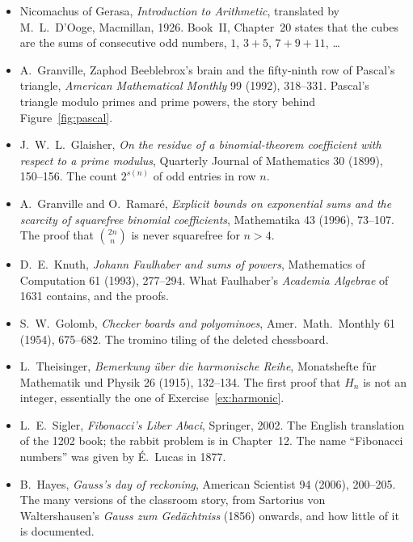 \begin{itemize}
\item Nicomachus of Gerasa, \emph{Introduction to Arithmetic}, translated by M.~L.~D'Ooge, Macmillan, 1926. Book~II, Chapter~20 states that the cubes are the sums of consecutive odd numbers, $1$, $3+5$, $7+9+11$, \dots
\item A.~Granville, Zaphod Beeblebrox's brain and the fifty-ninth row of Pascal's triangle, \emph{American Mathematical Monthly} 99 (1992), 318--331. Pascal's triangle modulo primes and prime powers, the story behind Figure~\ref{fig:pascal}.
\item J.~W.~L.~Glaisher, \emph{On the residue of a binomial-theorem coefficient with respect to a prime modulus}, Quarterly Journal of Mathematics 30 (1899), 150--156. The count $2^{s(n)}$ of odd entries in row $n$.
\item A.~Granville and O.~Ramar\'e, \emph{Explicit bounds on exponential sums and the scarcity of squarefree binomial coefficients}, Mathematika 43 (1996), 73--107. The proof that $\binom{2n}n$ is never squarefree for $n>4$.
\item D.~E.~Knuth, \emph{Johann Faulhaber and sums of powers}, Mathematics of Computation 61 (1993), 277--294. What Faulhaber's \emph{Academia Algebrae} of 1631 contains, and the proofs.
\item S.~W.~Golomb, \emph{Checker boards and polyominoes}, Amer.\ Math.\ Monthly 61 (1954), 675--682. The tromino tiling of the deleted chessboard.
\item L.~Theisinger, \emph{Bemerkung \"uber die harmonische Reihe}, Monatshefte f\"ur Mathematik und Physik 26 (1915), 132--134. The first proof that $H_n$ is not an integer, essentially the one of Exercise~\ref{ex:harmonic}.
\item L.~E.~Sigler, \emph{Fibonacci's Liber Abaci}, Springer, 2002. The English translation of the 1202 book; the rabbit problem is in Chapter~12. The name ``Fibonacci numbers'' was given by \'E.~Lucas in 1877.
\item B.~Hayes, \emph{Gauss's day of reckoning}, American Scientist 94 (2006), 200--205. The many versions of the classroom story, from Sartorius von Waltershausen's \emph{Gauss zum Ged\"achtniss} (1856) onwards, and how little of it is documented.
\end{itemize}
